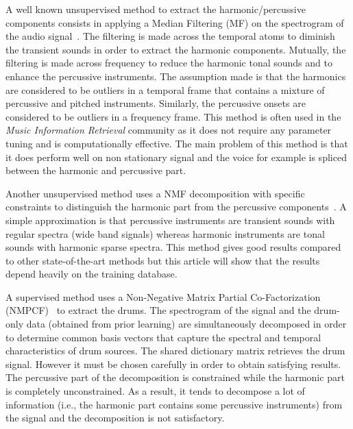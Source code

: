 A well known unsupervised method to extract the harmonic/percussive components consists in applying a Median Filtering (MF) on the spectrogram of the audio signal~\cite{fitzgerald2010harmonic}. The filtering is made across the temporal atoms to diminish the transient sounds in order to extract the harmonic components. Mutually, the filtering is made across frequency to reduce the harmonic tonal sounds and to enhance the percussive instruments. The assumption made is that the harmonics are considered to be outliers in a temporal frame that contains a mixture of percussive and pitched instruments. Similarly, the percussive onsets are considered to be outliers in a frequency frame. This method is often used in the \emph{Music Information Retrieval} community as it does not require any parameter tuning and is computationally effective. The main problem of this method is that it does perform well on non stationary signal and the voice for example is spliced between the harmonic and percussive part. 

Another unsupervised method uses a NMF decomposition with specific constraints to distinguish the harmonic part from the percussive components~\cite{canadas2014percussive}. A simple approximation is that percussive instruments are transient sounds with regular spectra (wide band signals) whereas harmonic instruments are tonal sounds with harmonic sparse spectra. This method gives good results compared to other state-of-the-art methods but this article will show that the results depend heavily on the training database.

A supervised method uses a Non-Negative Matrix Partial Co-Factorization (NMPCF)~\cite{kim2011nonnegative} to extract the drums. The spectrogram of the signal and the drum-only data (obtained from prior learning) are simultaneously decomposed in order to determine common basis vectors that capture the spectral and temporal characteristics of drum sources. The shared dictionary matrix retrieves the drum signal. However it must be chosen carefully in order to obtain satisfying results. The percussive part of the decomposition is constrained while the harmonic part is completely unconstrained. As a result, it tends to decompose a lot of information (i.e., the harmonic part contains some percussive instruments) from the signal and the decomposition is not satisfactory.

